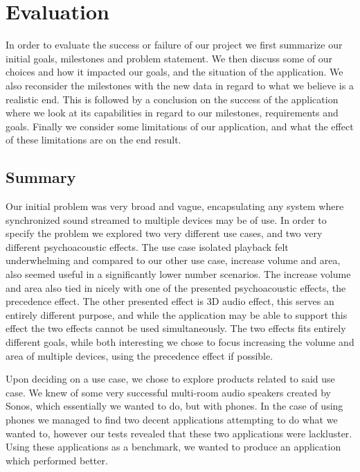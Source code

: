 \chapter{Evaluation}\label{cha:conclusion}
In order to evaluate the success or failure of our project we first summarize our initial goals, milestones and problem statement.
We then discuss some of our choices and how it impacted our goals, and the situation of the application.
We also reconsider the milestones with the new data in regard to what we believe is a realistic end.
This is followed by a conclusion on the success of the application where we look at its capabilities in regard to our milestones, requirements and goals.
Finally we consider some limitations of our application, and what the effect of these limitations are on the end result.

\section{Summary}
Our initial problem was very broad and vague, encapsulating any system where synchronized sound streamed to multiple devices may be of use.
In order to specify the problem we explored two very different use cases, and two very different psychoacoustic effects.
The use case isolated playback felt underwhelming and compared to our other use case, increase volume and area, also seemed useful in a significantly lower number scenarios.
The increase volume and area also tied in nicely with one of the presented psychoacoustic effects, the precedence effect.
The other presented effect is 3D audio effect, this serves an entirely different purpose, and while the application may be able to support this effect the two effects cannot be used simultaneously. 
The two effects fits entirely different goals, while both interesting we chose to focus increasing the volume and area of multiple devices, using the precedence effect if possible.

Upon deciding on a use case, we chose to explore products related to said use case.
We knew of some very successful multi-room audio speakers created by Sonos, which essentially we wanted to do, but with phones.
In the case of using phones we managed to find two decent applications attempting to do what we wanted to, however our tests revealed that these two applications were lackluster. 
Using these applications as a benchmark, we wanted to produce an application which performed better.

